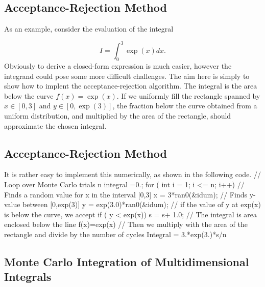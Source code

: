 \documentclass[%
oneside,                 %
final,                   %
10pt]{article}
\newenvironment{block_mdfboxadmon}[1][]{
\begin{block_mdfboxmdframed}[frametitle=#1]
}
{
\end{block_mdfboxmdframed}
}
\begin{document}
\subsection{Acceptance-Rejection Method}

\begin{block_mdfboxadmon}[]

As an example, consider the evaluation of the integral

\begin{equation*}
   I=\int_0^3\exp{(x)}dx.
\end{equation*}
Obviously to derive a closed-form expression is much easier, however the integrand could pose some more
difficult challenges. The aim here is simply to show how to implent the acceptance-rejection algorithm.
The integral is the area below the curve $f(x)=\exp{(x)}$. If we uniformly fill the rectangle
spanned by $x\in [0,3]$ and $y\in [0,\exp{(3)}]$, the fraction below the curve obtained from a uniform distribution, and
multiplied by the area of the rectangle, should approximate the chosen integral.
\end{block_mdfboxadmon} %



\subsection{Acceptance-Rejection Method}

\begin{block_mdfboxadmon}[]
It is rather
easy to implement this numerically, as shown in the following code.
\bcppcod
//   Loop over Monte Carlo trials n
     integral =0.;
     for ( int i = 1;  i <= n; i++){
//   Finds a random value for x in the interval [0,3]
          x = 3*ran0(&idum);
//   Finds y-value between [0,exp(3)]
          y = exp(3.0)*ran0(&idum);
//   if the value of y at exp(x) is below the curve, we accept
          if ( y  < exp(x)) s = s+ 1.0;
//   The integral is area enclosed below the line f(x)=exp(x)
    }
//  Then we multiply with the area of the rectangle and divide by the number of cycles 
    Integral = 3.*exp(3.)*s/n
\ecppcod
\end{block_mdfboxadmon} %



\subsection{Monte Carlo Integration of Multidimensional Integrals}
\end{document}
